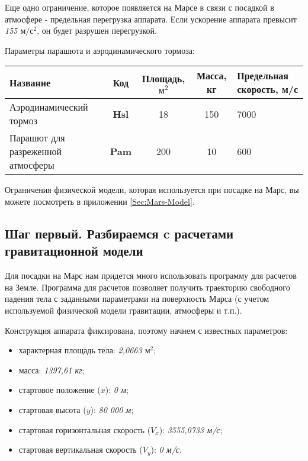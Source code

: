 \documentclass[12pt,a4paper]{article}
\begin{document}
Еще одно ограничение, которое появляется на Марсе в связи с посадкой в атмосфере -
предельная перегрузка аппарата. Если ускорение аппарата превысит \emph{155
  $\text{м}/\text{с}^2$}, он будет разрушен перегрузкой.

Параметры парашюта и аэродинамического тормоза:

\begin{center}
\begin{tabular}{ |p{5cm}|c|c|c|p{3cm}| } 
  \hline
  \textbf{Название} & \textbf{Код} & \textbf{Площадь, $\text{м}^2$} & \textbf{Масса, кг} &
  \textbf{Предельная скорость, м/с} \\
  \hline
  Аэродинамический тормоз & \textbf{Hsl} & 18 & 150 & 7000 \\
  \hline
  Парашют для разреженной атмосферы & \textbf{Pam} & 200 & 10 & 600 \\
  \hline
\end{tabular}
\end{center}

Ограничения физической модели, которая используется при посадке на Марс, вы можете
посмотреть в приложении \ref{Sec:Mars-Model}.

\subsection{Шаг первый. Разбираемся c расчетами гравитационной модели}

Для посадки на Марс нам придется много использовать программу для расчетов на
Земле. Программа для расчетов позволяет получить траекторию свободного падения тела с
заданными параметрами на поверхность Марса (с учетом используемой физической модели
гравитации, атмосферы и т.п.).

Конструкция аппарата фиксирована, поэтому начнем с известных параметров:

\begin{itemize}
  \item характерная площадь тела: \emph{2,0663 $\text{м}^2$};
  \item масса: \emph{1397,61 кг};
  \item стартовое положение ($x$): \emph{0 м};
  \item стартовая высота ($y$): \emph{80 000 м};
  \item стартовая горизонтальная скорость ($V_x$): \emph{3555,0733 м/с};
  \item стартовая вертикальная скорость ($V_y$): \emph{0 м/с}.
\end{itemize}
\end{document}
